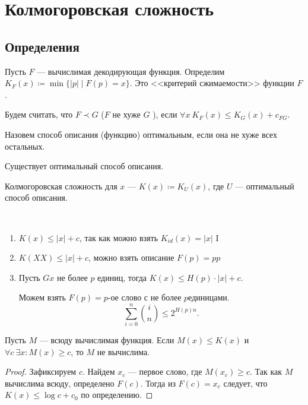 \chapter{Колмогоровская сложность}


\section{Определения}

Пусть $ F$ --- вычислимая декодирующая функция.
Определим $ K_F(x) \coloneqq \min \{\lvert p \rvert \mid F(p) = x\}$. Это <<критерий сжимаемости>> функции $ F$.

Будем считать, что $ F \prec G$ ($ F$ не хуже  $ G$ ), если $ \forall x ~ K_F(x) \le K_G(x) + c_{FG}$.

Назовем способ описания (функцию) оптимальным, если она не хуже всех остальных.

\begin{thm}
    Существует оптимальный способ описания.
\end{thm}

\begin{defn}[]
	Колмогоровская сложность для $ x$ --- $ K(x) \coloneqq K_U(x)$, где $ U$ --- оптимальный способ описания.
\end{defn}
\begin{prop}
	~\begin{enumerate}
		\item
	$ K(x) \le \lvert x \rvert +c$, так как можно взять $ K_{id}(x) = \lvert x \rvert $
	I
\item $ K(XX) \le \lvert x \rvert +c$, можно взять описание $ F(p) = pp$ 
\item Пусть $G x$ не более $ p$ единиц, тогда $ K(x) \le H(p) \cdot \lvert x \rvert + c$.

	Можем взять $ F(p) = p\text{-ое слово с не более } p \text{единицами}$.
	\[
		\sum_{i=0}^{n} {i \choose n} \le 2 ^{H(p) n}
	.\] 
	\end{enumerate}
\end{prop}

\begin{thm}
	Пусть $ M$ --- всюду вычислимая функция. Если $ M(x) \le K(x)$ и $ \forall c ~ \exists x \colon M(x) \ge c$, то $ M$ не вычислима.
\end{thm}
\begin{proof}
	Зафиксируем $ c$. Найдем  $ x_c$ --- первое слово, где  $ M(x_c) \ge c$. Так как $ M$ вычислима всюду, определено $ F(c)$. 
	Тогда из $ F(c) = x_c$ следует, что  $ K(x) \le  \log c + c_0$ по определению.
\end{proof}

